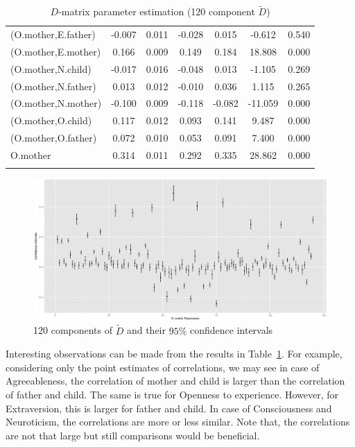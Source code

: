 \documentclass[11pt,a5paper,twoside]{book}
\begin{document}
{{\begin{center}
\begin{longtable}{@{\extracolsep{\fill}}lcccccc@{}}
   (O.mother,E.father)  & -0.007 & 0.011 & -0.028 & 0.015 & -0.612 & 0.540 \\ 
   (O.mother,E.mother)  & 0.166 & 0.009 & 0.149 & 0.184 & 18.808 & 0.000 \\ 
   (O.mother,N.child)  & -0.017 & 0.016 & -0.048 & 0.013 & -1.105 & 0.269 \\ 
   (O.mother,N.father)  & 0.013 & 0.012 & -0.010 & 0.036 & 1.115 & 0.265 \\ 
   (O.mother,N.mother)  & -0.100 & 0.009 & -0.118 & -0.082 & -11.059 & 0.000 \\ 
   (O.mother,O.child)  & 0.117 & 0.012 & 0.093 & 0.141 & 9.487 & 0.000 \\ 
   (O.mother,O.father)  & 0.072 & 0.010 & 0.053 & 0.091 & 7.400 & 0.000 \\ 
   O.mother  & 0.314 & 0.011 & 0.292 & 0.335 & 28.862 & 0.000 \\ 
   \hline
   \caption{$D$-matrix parameter estimation (120 component $\tilde{D}$)}
\label{d_est}
\end{longtable}

\end{center}
}}




\begin{figure}
\centering
\includegraphics[width=\textwidth]{d_param.eps}
\caption{120 components of $\tilde{D}$ and their $95\%$ confidence intervals} 
\label{d_ci}
\end{figure} 

Interesting observations can be made from the results in Table~\ref{d_est}. For example, considering only the point estimates of correlations, we may see in case of Agreeableness, the correlation of mother and child is larger than the correlation of father and child. The same is true for Openness to experience. However, for Extraversion, this is larger for father and child. In case of Consciousness and Neuroticism, the correlations are more or less similar. Note that, the correlations are not that large but still comparisons would be beneficial.
\end{document}
